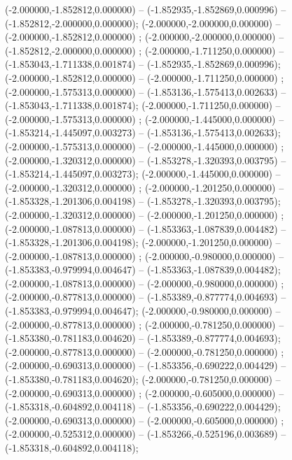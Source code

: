  (-2.000000,-1.852812,0.000000) -- (-1.852935,-1.852869,0.000996) -- (-1.852812,-2.000000,0.000000);
 (-2.000000,-2.000000,0.000000) -- (-2.000000,-1.852812,0.000000) ;
 (-2.000000,-2.000000,0.000000) -- (-1.852812,-2.000000,0.000000) ;
 (-2.000000,-1.711250,0.000000) -- (-1.853043,-1.711338,0.001874) -- (-1.852935,-1.852869,0.000996);
 (-2.000000,-1.852812,0.000000) -- (-2.000000,-1.711250,0.000000) ;
 (-2.000000,-1.575313,0.000000) -- (-1.853136,-1.575413,0.002633) -- (-1.853043,-1.711338,0.001874);
 (-2.000000,-1.711250,0.000000) -- (-2.000000,-1.575313,0.000000) ;
 (-2.000000,-1.445000,0.000000) -- (-1.853214,-1.445097,0.003273) -- (-1.853136,-1.575413,0.002633);
 (-2.000000,-1.575313,0.000000) -- (-2.000000,-1.445000,0.000000) ;
 (-2.000000,-1.320312,0.000000) -- (-1.853278,-1.320393,0.003795) -- (-1.853214,-1.445097,0.003273);
 (-2.000000,-1.445000,0.000000) -- (-2.000000,-1.320312,0.000000) ;
 (-2.000000,-1.201250,0.000000) -- (-1.853328,-1.201306,0.004198) -- (-1.853278,-1.320393,0.003795);
 (-2.000000,-1.320312,0.000000) -- (-2.000000,-1.201250,0.000000) ;
 (-2.000000,-1.087813,0.000000) -- (-1.853363,-1.087839,0.004482) -- (-1.853328,-1.201306,0.004198);
 (-2.000000,-1.201250,0.000000) -- (-2.000000,-1.087813,0.000000) ;
 (-2.000000,-0.980000,0.000000) -- (-1.853383,-0.979994,0.004647) -- (-1.853363,-1.087839,0.004482);
 (-2.000000,-1.087813,0.000000) -- (-2.000000,-0.980000,0.000000) ;
 (-2.000000,-0.877813,0.000000) -- (-1.853389,-0.877774,0.004693) -- (-1.853383,-0.979994,0.004647);
 (-2.000000,-0.980000,0.000000) -- (-2.000000,-0.877813,0.000000) ;
 (-2.000000,-0.781250,0.000000) -- (-1.853380,-0.781183,0.004620) -- (-1.853389,-0.877774,0.004693);
 (-2.000000,-0.877813,0.000000) -- (-2.000000,-0.781250,0.000000) ;
 (-2.000000,-0.690313,0.000000) -- (-1.853356,-0.690222,0.004429) -- (-1.853380,-0.781183,0.004620);
 (-2.000000,-0.781250,0.000000) -- (-2.000000,-0.690313,0.000000) ;
 (-2.000000,-0.605000,0.000000) -- (-1.853318,-0.604892,0.004118) -- (-1.853356,-0.690222,0.004429);
 (-2.000000,-0.690313,0.000000) -- (-2.000000,-0.605000,0.000000) ;
 (-2.000000,-0.525312,0.000000) -- (-1.853266,-0.525196,0.003689) -- (-1.853318,-0.604892,0.004118);
